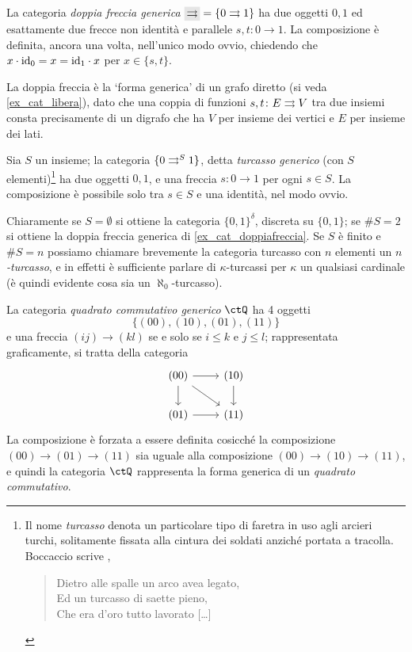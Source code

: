 \begin{example}\label{ex_cat_doppiafreccia}
 La categoria \emph{doppia freccia generica} \(\genAArrow=\{0\toto 1\}\) ha due oggetti \(0,1\) ed esattamente due frecce non identità e parallele \(s,t \colon 0\to 1\). La composizione è definita, ancora una volta, nell'unico modo ovvio, chiedendo che \(x\cdot \mathrm{id}_0=x=\mathrm{id}_1\cdot x\) per \(x\in\{s,t\}\).

 La doppia freccia è la `forma generica' di un grafo diretto (si veda \ref{ex_cat_libera}), dato che una coppia di funzioni \(s,t\colon E \rightrightarrows V\) tra due insiemi consta precisamente di un digrafo che ha \(V\) per insieme dei vertici e \(E\) per insieme dei lati.
\end{example}
\begin{example}\label{ex_cat_turcasso}
 Sia \(S\) un insieme; la categoria \(\turk\), detta \emph{turcasso generico} (con \(S\) elementi)\footnote{Il nome \emph{turcasso} denota un particolare tipo di faretra in uso agli arcieri turchi, solitamente fissata alla cintura dei soldati anziché portata a tracolla. Boccaccio scrive \cite{boccaccio1831teseide},
  \begin{verse}
   Dietro alle spalle un arco avea legato,\\
   Ed un turcasso di saette pieno,\\
   Che era d'oro tutto lavorato [\dots\unkern]
  \end{verse}} ha due oggetti \(0,1\), e una freccia \(s \colon 0\to 1\) per ogni \(s\in S\). La composizione è possibile solo tra \(s\in S\) e una identità, nel modo ovvio.

 Chiaramente se \(S=\emptyset\) si ottiene la categoria \(\{0,1\}^\delta\), discreta su \(\{0,1\}\); se \(\#S=2\) si ottiene la doppia freccia generica di \ref{ex_cat_doppiafreccia}. Se \(S\) è finito e \(\#S=n\) possiamo chiamare brevemente la categoria turcasso con \(n\) elementi un \emph{\(n\)-turcasso}, e in effetti è sufficiente parlare di \(\kappa\)-turcassi per \(\kappa\) un qualsiasi cardinale (è quindi evidente cosa sia un \(\aleph_0\)-turcasso).
\end{example}
\begin{example}\label{ex_quadcuboncubo}
 La categoria \emph{quadrato commutativo generico} \(\ctQ\) ha 4 oggetti
 \[\{(00),(10),(01),(11)\} \]
 e una freccia \((ij)\to(kl)\) se e solo se \(i\le k\) e \(j\le l\); rappresentata graficamente, si tratta della categoria
 \[\begin{tikzcd}
   (00) \ar[r]\ar[d]\ar[dr]& (10)\ar[d] \\
   (01) \ar[r]& (11)
  \end{tikzcd}\]
 La composizione è forzata a essere definita cosicché la composizione \((00)\to (01)\to (11)\) sia uguale alla composizione \((00)\to (10)\to (11)\), e quindi la categoria \(\ctQ\) rappresenta la forma generica di un \emph{quadrato commutativo}.
\end{example}
